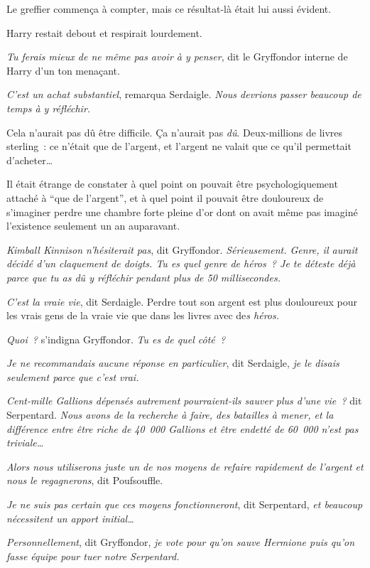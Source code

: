 Le greffier commença à compter, mais ce résultat-là était lui aussi évident.

Harry restait debout et respirait lourdement.

\emph{Tu ferais mieux de ne même pas avoir à y penser}, dit le Gryffondor interne de Harry d'un ton menaçant.

\emph{C'est un achat substantiel}, remarqua Serdaigle. \emph{Nous devrions passer beaucoup de temps à y réfléchir.}

Cela n'aurait pas dû être difficile. Ça n'aurait pas \emph{dû}. Deux-millions de livres sterling~: ce n'était que de l'argent, et l'argent ne valait que ce qu'il permettait d'acheter…

Il était étrange de constater à quel point on pouvait être psychologiquement attaché à “que de l'argent”, et à quel point il pouvait être douloureux de s'imaginer perdre une chambre forte pleine d'or dont on avait même pas imaginé l'existence seulement un an auparavant.

\emph{Kimball Kinnison n'hésiterait pas}, dit Gryffondor. \emph{Sérieusement. Genre, il aurait décidé d'un claquement de doigts. Tu es quel genre de héros~? Je te déteste déjà parce que tu as dû y réfléchir pendant plus de 50 millisecondes.}

\emph{C'est la vraie vie}, dit Serdaigle. Perdre tout son argent est plus douloureux pour les vrais gens de la vraie vie que dans les livres avec de\emph{s héros.}

\emph{Quoi~?} s'indigna Gryffondor. \emph{Tu es de quel côté~?}

\emph{Je ne recommandais aucune réponse en particulier}, dit Serdaigle, \emph{je le disais seulement parce que c'est vrai.}

\emph{Cent-mille Gallions dépensés autrement pourraient-ils sauver plus d'une vie~?} dit Serpentard. \emph{Nous avons de la recherche à faire, des batailles à mener, et la différence entre être riche de 40~000 Gallions et être endetté de 60~000 n'est pas triviale…}

\emph{Alors nous utiliserons juste un de nos moyens de refaire rapidement de l'argent et nous le regagnerons}, dit Poufsouffle.

\emph{Je ne suis pas certain que ces moyens fonctionneront}, dit Serpentard, \emph{et beaucoup nécessitent un apport initial…}

\emph{Personnellement}, dit Gryffondor, \emph{je vote pour qu'on sauve Hermione puis qu'on fasse équipe pour tuer notre Serpentard.}

